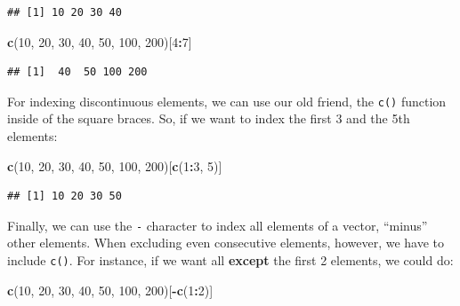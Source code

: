 \documentclass[]{book}
\newenvironment{Shaded}{\begin{snugshade}}{\end{snugshade}}
\newcommand{\DecValTok}[1]{\textcolor[rgb]{0.00,0.00,0.81}{#1}}
\newcommand{\KeywordTok}[1]{\textcolor[rgb]{0.13,0.29,0.53}{\textbf{#1}}}
\newcommand{\NormalTok}[1]{#1}
\newcommand{\OperatorTok}[1]{\textcolor[rgb]{0.81,0.36,0.00}{\textbf{#1}}}
\begin{document}
\begin{verbatim}
## [1] 10 20 30 40
\end{verbatim}

\begin{Shaded}
\begin{Highlighting}[]
\KeywordTok{c}\NormalTok{(}\DecValTok{10}\NormalTok{, }\DecValTok{20}\NormalTok{, }\DecValTok{30}\NormalTok{, }\DecValTok{40}\NormalTok{, }\DecValTok{50}\NormalTok{, }\DecValTok{100}\NormalTok{, }\DecValTok{200}\NormalTok{)[}\DecValTok{4}\OperatorTok{:}\DecValTok{7}\NormalTok{]}
\end{Highlighting}
\end{Shaded}

\begin{verbatim}
## [1]  40  50 100 200
\end{verbatim}

For indexing discontinuous elements, we can use our old friend, the \texttt{c()} function inside of the square braces. So, if we want to index the first 3 and the 5th elements:

\begin{Shaded}
\begin{Highlighting}[]
\KeywordTok{c}\NormalTok{(}\DecValTok{10}\NormalTok{, }\DecValTok{20}\NormalTok{, }\DecValTok{30}\NormalTok{, }\DecValTok{40}\NormalTok{, }\DecValTok{50}\NormalTok{, }\DecValTok{100}\NormalTok{, }\DecValTok{200}\NormalTok{)[}\KeywordTok{c}\NormalTok{(}\DecValTok{1}\OperatorTok{:}\DecValTok{3}\NormalTok{, }\DecValTok{5}\NormalTok{)]}
\end{Highlighting}
\end{Shaded}

\begin{verbatim}
## [1] 10 20 30 50
\end{verbatim}

Finally, we can use the \texttt{-} character to index all elements of a vector, ``minus'' other elements. When excluding even consecutive elements, however, we have to include \texttt{c()}. For instance, if we want all \textbf{except} the first 2 elements, we could do:

\begin{Shaded}
\begin{Highlighting}[]
\KeywordTok{c}\NormalTok{(}\DecValTok{10}\NormalTok{, }\DecValTok{20}\NormalTok{, }\DecValTok{30}\NormalTok{, }\DecValTok{40}\NormalTok{, }\DecValTok{50}\NormalTok{, }\DecValTok{100}\NormalTok{, }\DecValTok{200}\NormalTok{)[}\OperatorTok{-}\KeywordTok{c}\NormalTok{(}\DecValTok{1}\OperatorTok{:}\DecValTok{2}\NormalTok{)]}
\end{Highlighting}
\end{Shaded}
\end{document}
